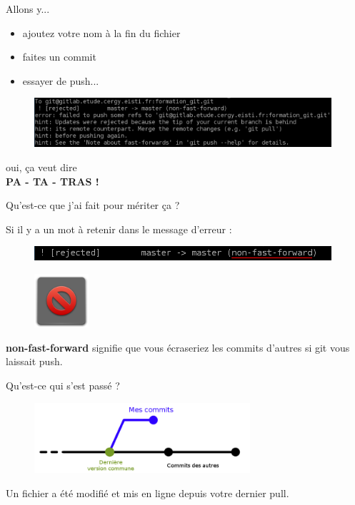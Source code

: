 \documentclass{beamer}
\begin{document}
\begin{frame}{Allons y...}
	\begin{itemize}
		\item ajoutez votre nom à la fin du fichier
		\item faites un commit
		\item essayer de push...
	\end{itemize}
	
	\begin{figure}
		\centering
		\includegraphics[width=11cm]{img/shot16}
	\end{figure}
	
	\begin{center}
	oui, ça veut dire\\
	{\Large \textbf{PA - TA - TRAS !}}
	\end{center}
\end{frame}

\begin{frame}{Qu'est-ce que j'ai fait pour mériter ça ?}
	
	Si il y a un mot à retenir dans le message d'erreur :
	\begin{figure}
		\centering
		\includegraphics[width=11cm]{img/shot17}
	\end{figure}
	\begin{figure}
		\centering
		\includegraphics[width=2cm]{img/stop}
	\end{figure}
	\textbf{non-fast-forward} signifie que vous écraseriez les commits d'autres si git vous laissait push.
	
\end{frame}

\begin{frame}{Qu'est-ce qui s'est passé ?}
	\begin{figure}
		\centering
		\includegraphics[width=8cm]{img/repo6}
	\end{figure}
	
	Un fichier a été modifié et mis en ligne depuis votre dernier pull.
		
\end{frame}
\end{document}
